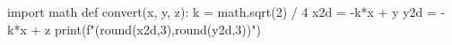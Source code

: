 \documentclass{article}
\begin{document}
    \begin{pycode}
import math
def convert(x, y, z):
    k = math.sqrt(2) / 4
    x2d = -k*x + y
    y2d = -k*x + z
    print(f"({round(x2d,3)},{round(y2d,3)})")
    \end{pycode}

    \begin{center}
    \end{center}

\end{document}

